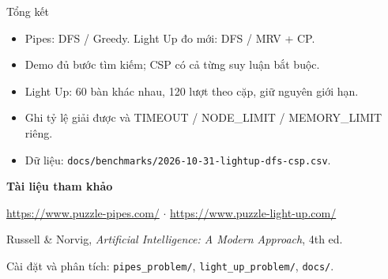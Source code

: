 \documentclass[aspectratio=169,11pt]{beamer}
\begin{document}
\begin{frame}{Tổng kết}
\begin{itemize}
\item Pipes: DFS / Greedy. Light Up đo mới: DFS / MRV + CP.
\item Demo đủ bước tìm kiếm; CSP có cả từng suy luận bắt buộc.
\item Light Up: 60 bàn khác nhau, 120 lượt theo cặp, giữ nguyên giới hạn.
\item Ghi tỷ lệ giải được và TIMEOUT / NODE\_LIMIT / MEMORY\_LIMIT riêng.
\item Dữ liệu: \texttt{docs/benchmarks/2026-10-31-lightup-dfs-csp.csv}.
\end{itemize}
\vspace{5mm}
\small\textbf{Tài liệu tham khảo}\par\vspace{2mm}
\url{https://www.puzzle-pipes.com/} $\cdot$ \url{https://www.puzzle-light-up.com/}\par
Russell \& Norvig, \emph{Artificial Intelligence: A Modern Approach}, 4th ed.\par
Cài đặt và phân tích: \texttt{pipes\_problem/}, \texttt{light\_up\_problem/}, \texttt{docs/}.
\end{frame}
\end{document}
